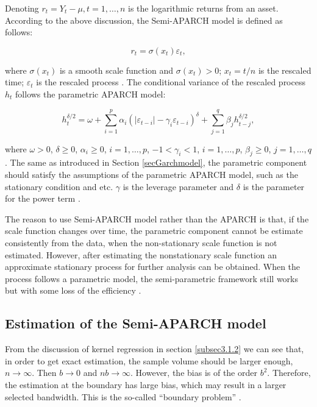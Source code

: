 Denoting $r_{t}= Y_t-\mu,t=1, \ldots,n$ is the logarithmic returns from an asset. According to the above discussion, the Semi-APARCH model is defined as follows:

\begin{equation}
r_{t} = \sigma(x_t)\varepsilon_{t},
\end{equation}

where $\sigma(x_t)$ is a smooth scale function and $\sigma(x_t) >0$; $x_t = t/n$ is the rescaled time; $\varepsilon_{t}$ is the rescaled process \citep{Feng2004}. The conditional variance of the rescaled process $h_{t}$ follows the parametric APARCH model:
  

\begin{equation}
h_{t}^{\delta/2} = \omega + \sum_{i=1}^{p} \alpha_{i}(|\varepsilon_{t-i}|-\gamma_{i}\varepsilon_{t-i})^{\delta} + \sum_{j=1}^{q}\beta_{j}h_{t-j}^{\delta/2},
\end{equation}

where $\omega>0$, $\delta\geq0$, $\alpha_{i}\geq0$, $i=1, \ldots, p$, $-1<\gamma_{i}<1$, $i=1, \ldots, p$, $\beta_{j}\geq0$, $j=1, \ldots, q$. The same as introduced in Section \ref{secGarchmodel}, the parametric component should satisfy the assumptions of the parametric APARCH model, such as the stationary condition and etc. $\gamma$ is the leverage parameter and $\delta$ is the parameter for the power term \citep{Ding1993}.


The reason to use Semi-APARCH model rather than the APARCH is that, if the scale function changes over time, the parametric component cannot be estimate consistently from the data, when the non-stationary scale function is not estimated. However, after estimating the nonstationary scale function an approximate stationary process for further analysis can be obtained. When the process follows a parametric model, the semi-parametric framework still works but with some loss of the efficiency \citep{FengYuanhua;Sun2013}.

\subsection{ Estimation of the Semi-APARCH model}

From the discussion of kernel regression in section \ref{subsec3.1.2} we can see that, in order to get exact estimation, the sample volume should be larger enough, $n\longrightarrow\infty$. Then $b\longrightarrow0$ and $nb\longrightarrow\infty$. However, the bias is of the order $b^2$. Therefore, the estimation at the boundary has large bias, which may result in a larger selected bandwidth. This is the so-called “boundary problem” \citep{Eubank1993}.


